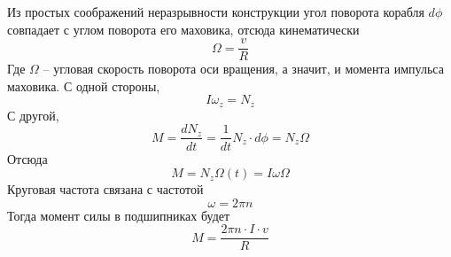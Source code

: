 \documentclass[a5paper,10pt]{article}
\begin{document}
Из простых соображений неразрывности конструкции угол поворота корабля $d\phi$ совпадает с углом поворота его маховика, отсюда кинематически
\begin{equation}
	\Omega=\frac{v}{R}
\end{equation}
Где $\Omega$ -- угловая скорость поворота оси вращения, а значит, и момента импульса маховика.
С одной стороны, 
\begin{equation}
	I\omega_z={N}_z
\end{equation}
С другой,
\begin{equation}
	{M}=\frac{d{N_z}}{dt}=\frac{1}{dt}{N_z}\cdot d\phi ={N_z}\Omega
\end{equation}
Отсюда
\begin{equation}
	M={N_z\Omega(t)}={I\omega\Omega}
\end{equation}
Круговая частота связана с частотой
\begin{equation}
	\omega=2\pi n
\end{equation}
Тогда момент силы в подшипниках будет
\begin{equation}
	M=\frac{2\pi n\cdot I\cdot v}{R}
\end{equation}
\end{document}
